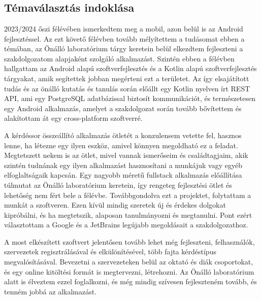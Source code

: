 \chapter{\bevezetes}

\section{Témaválasztás indoklása}

2023/2024 őszi félévében ismerkedtem meg a mobil, azon belül is az Android fejlesztéssel.
Az ezt követő félévben tovább mélyítettem a tudásomat ebben a témában, az Önálló laboratórium tárgy keretein belül elkezdtem fejleszteni a szakdolgozatom alapjaként szolgáló alkalmazást.
Szintén ebben a félévben hallgattam az Android alapú szoftverfejlesztés és a Kotlin alapú szoftverfejlesztés tárgyakat, amik segítettek jobban megérteni ezt a területet.
Az így elsajátított tudás és az önálló kutatás és tanulás során előállt egy Kotlin nyelven írt REST API, ami egy PostgreSQL adatbázissal biztosít kommunikációt, és természetesen egy Android alkalmazás, amelyet a szakdolgozat során tovább bővítettem és alakítottam át egy cross-platform szoftverré.

A kérdéssor összeállító alkalmazás ötletét a konzulensem vetette fel, hasznos lenne, ha létezne egy ilyen eszköz, amivel könnyen megoldható ez a feladat.
Megtetszett nekem is az ötlet, mivel vannak ismerőseim és családtagjaim, akik szintén tudnának egy ilyen alkalmazást hasznosítani a munkájuk vagy egyéb elfoglaltságaik kapcsán.
Egy nagyobb méretű fullstack alkalmazás előállítása túlmutat az Önálló laboratórium keretein, így rengeteg fejlesztési ötlet és lehetőség nem fért bele a félévbe.
Továbbgondolva ezt a projektet, folytattam a munkát a szoftveren.
Ezen kívül mindig szeretek új és érdekes dolgokat kipróbálni, és ha megtetszik, alaposan tanulmányozni és megtanulni.
Pont ezért választottam a Google és a JetBrains legújabb megoldásait a szakdolgozathoz.

A most elkészített szoftvert jelentősen tovább lehet még fejleszteni, felhasználók, szervezetek regisztrálásával és elkülönítésével, több fajta kérdéstípus megvalósításával.
Bevezetni a szervezeteken belül az oktató és diák csoportokat, és egy online kitöltési formát is megtervezni, létrehozni.
Az Önálló laboratórium alatt is élveztem ezzel foglalkozni, és még mindig szívesen fejleszteném tovább, és tenném jobbá az alkalmazást.

